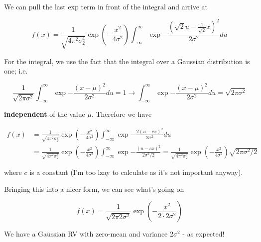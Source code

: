We can pull the last exp term in front of the integral and arrive at

\[
f(x) = \frac{1}{\sqrt{4\pi^2\sigma_2^4}} \exp{\left(- \frac{x^2}{4\sigma^2} \right)} \int_{-\infty}^\infty \exp{- \frac{ \left(\sqrt{2}u - \frac{1}{\sqrt{2}} x\right)^2}{2\sigma^2}} du
\]

For the integral, we use the fact that the integral over a Gaussian
distribution is one; i.e.

\[
\frac{1}{\sqrt{2\pi\sigma^2}} \int_{-\infty}^\infty \exp{- \frac{ (x-\mu)^2 }{2\sigma^2}} du = 1 \rightarrow \int_{-\infty}^\infty \exp{- \frac{ (x-\mu)^2 }{2\sigma^2}} du = \sqrt{2\pi\sigma^2}
\]

\textbf{independent} of the value \(\mu\). Therefore we have

\begin{align*}
f(x) &= \frac{1}{\sqrt{4\pi^2\sigma_2^4}} \exp{\left(- \frac{x^2}{4\sigma^2} \right)} \int_{-\infty}^\infty \exp{- \frac{ 2 \left(u - c x\right)^2}{2\sigma^2}} du \\ &= \frac{1}{\sqrt{4\pi^2\sigma_2^4}} \exp{\left(- \frac{x^2}{4\sigma^2} \right)} \int_{-\infty}^\infty \exp{- \frac{ \left(u - c x\right)^2}{2\sigma^2 / 2}} = \frac{1}{\sqrt{4\pi^2\sigma_2^4}} \exp{\left(- \frac{x^2}{4\sigma^2} \right)} \sqrt{2\pi\sigma^2 / 2}
\end{align*}

where \(c\) is a constant (I'm too lzay to calculate as it's not
important anyway).

Bringing this into a nicer form, we can see what's going on

\[
f(x) = \frac{1}{\sqrt{2\pi2\sigma^2}} \exp{\left(- \frac{x^2}{2 \cdot 2 \sigma^2} \right)} 
\]

We have a Gaussian RV with zero-mean and variance \(2\sigma^2\) - as
expected!
